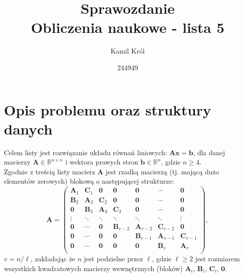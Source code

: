 \documentclass[]{article}
\title{
	Sprawozdanie \\
	\large 
	Obliczenia naukowe - lista 5}
\author{Kamil Król}
\date{244949}
\newcommand{\mA}{\bm{A}}
\newcommand{\mB}{\bm{B}}
\newcommand{\mC}{\bm{C}}
\newcommand{\mZ}{\bm{0}}
\newcommand{\vb}{\bm{b}}
\newcommand{\vx}{\bm{x}}
\newcommand{\R}{\mathbb{R}}
\begin{document}
	
	\maketitle
	
	\section*{Opis problemu oraz struktury danych}
	Celem listy jest rozwiązanie układu równań liniowych: 
	$\mA\vx = \vb$,
	dla danej macierzy $\mA \in \R^{n\times n}$ 
	i wektora prawych stron $\vb \in \R^n$, gdzie $n \geq 4$. \\
	
	\noindent Zgodnie z treścią listy macierz $\mA$ jest rzadką macierzą (tj. mającą dużo elementów zerowych) blokową o następującej strukturze:
	\begin{equation}
	\mA =
	\left(\begin{array}{ccccccc}
	\mA_1 & \mC_1 & \mZ & \mZ & \mZ & \cdots & \mZ \\
	\mB_2 & \mA_2 & \mC_2 & \mZ & \mZ  & \cdots & \mZ \\
	\mZ  & \mB_3 & \mA_3 & \mC_3 & \mZ  & \cdots & \mZ \\
	\vdots & \ddots & \ddots & \ddots & \ddots & \ddots & \vdots\\
	\mZ   & \cdots & \mZ  & \mB_{v-2} & \mA_{v-2} & \mC_{v-2} & \mZ \\
	\mZ  & \cdots & \mZ  &  \mZ &\mB_{v-1} & \mA_{v-1} & \mC_{v-1}  \\
	\mZ  & \cdots & \mZ & \mZ & \mZ& \mB_{v} & \mA_{v}  \\
	\end{array}\right),
	\end{equation} 
	$v = n/\ell$, zakładając że $n$ jest podzielne przez $\ell$, gdzie $\ell \geq 2$ jest rozmiarem wszystkich kwadratowych macierzy wewnętrznych (bloków) $\mA_i$, $\mB_i$, $\mC_i$, $\mZ$. \\
	
\end{document}
